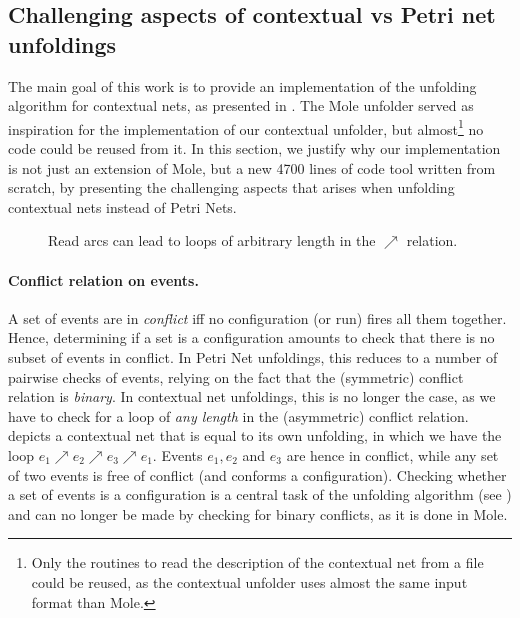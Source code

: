 \documentclass[11pt,a4paper]{article}
\begin{document}
\subsection{Challenging aspects of contextual vs Petri net unfoldings}
\label{sec:challenging.aspects}

The main goal of this work is to provide an implementation of the unfolding
algorithm for contextual nets, as presented in .  The Mole
unfolder  served as inspiration for the implementation of our
contextual unfolder, but almost\footnote{Only the routines to read the
description of the contextual net from a file could be reused, as the
contextual unfolder uses almost the same input format than Mole.} no code could
be reused from it.  In this section, we justify why our implementation is not
just an extension of Mole, but a new 4700 lines of code tool written from
scratch, by presenting the challenging aspects that arises when unfolding
contextual nets instead of Petri Nets.

\begin{figure}
\caption{Read arcs can lead to loops of arbitrary length in the $\nearrow$
relation.}
\label{fig:read.arcs}
\end{figure}

\paragraph{Conflict relation on events.}  A set of events are in
\emph{conflict} iff no configuration (or run) fires all them together.  Hence,
determining if a set is a configuration amounts to check that there is no
subset of events in conflict.  In Petri Net unfoldings, this reduces to a
number of pairwise checks of events, relying on the fact that the (symmetric)
conflict relation is \emph{binary}.  In contextual net unfoldings, this is no
longer the case, as we have to check for a loop of \emph{any length} in the
(asymmetric) conflict relation.   depicts a contextual net that
is equal to its own unfolding, in which we have the loop $e_1 \nearrow e_2
\nearrow e_3 \nearrow e_1$.  Events $e_1, e_2$ and $e_3$ are hence in conflict,
while any set of two events is free of conflict (and conforms a configuration).
Checking whether a set of events is a configuration is a central task of the
unfolding algorithm (see ) and can no longer be made
by checking for binary conflicts, as it is done in Mole.
\end{document}
